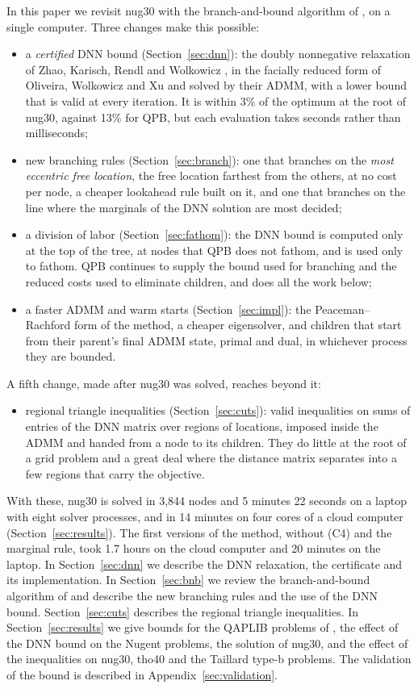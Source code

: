 \documentclass[10pt]{article}
\theoremstyle{remark}
\begin{document}
In this paper we revisit nug30 with the branch-and-bound algorithm of
\cite{ba01,abgl}, on a single computer. Three changes make this possible:
\begin{itemize}
\item[(C1)] a \emph{certified} DNN bound (Section~\ref{sec:dnn}): the doubly
  nonnegative relaxation of Zhao, Karisch, Rendl and Wolkowicz \cite{zkrw}, in the
  facially reduced form of Oliveira, Wolkowicz and Xu \cite{owx} and solved by their
  ADMM, with a lower bound that is valid at every iteration. It is within 3\% of the
  optimum at the root of nug30, against 13\% for QPB, but each evaluation takes
  seconds rather than milliseconds;
\item[(C2)] new branching rules (Section~\ref{sec:branch}): one that branches on the
  \emph{most eccentric free location}, the free location farthest from the others,
  at no cost per node, a cheaper lookahead rule built on it, and one that branches
  on the line where the marginals of the DNN solution are most decided;
\item[(C3)] a division of labor (Section~\ref{sec:fathom}): the DNN bound is computed
  only at the top of the tree, at nodes that QPB does not fathom, and is used only to
  fathom. QPB continues to supply the bound used for branching and the reduced costs
  used to eliminate children, and does all the work below;
\item[(C4)] a faster ADMM and warm starts (Section~\ref{sec:impl}): the
  Peaceman--Rachford form of the method, a cheaper eigensolver, and children that
  start from their parent's final ADMM state, primal and dual, in whichever
  process they are bounded.
\end{itemize}
A fifth change, made after nug30 was solved, reaches beyond it:
\begin{itemize}
\item[(C5)] regional triangle inequalities (Section~\ref{sec:cuts}): valid
  inequalities on sums of entries of the DNN matrix over regions of locations,
  imposed inside the ADMM and handed from a node to its children. They do little
  at the root of a grid problem and a great deal where the distance matrix
  separates into a few regions that carry the objective.
\end{itemize}
With these, nug30 is solved in 3,844 nodes and 5 minutes 22 seconds on a laptop with
eight solver processes, and in 14 minutes on four cores of a cloud computer
(Section~\ref{sec:results}). The first versions of the method, without (C4) and the
marginal rule, took 1.7 hours on the cloud computer and 20 minutes on the laptop. In Section~\ref{sec:dnn}
we describe the DNN relaxation, the certificate and its implementation. In
Section~\ref{sec:bnb} we review the branch-and-bound algorithm of \cite{abgl} and
describe the new branching rules and the use of the DNN bound.
Section~\ref{sec:cuts} describes the regional triangle inequalities. In
Section~\ref{sec:results} we give bounds for the QAPLIB problems of \cite{ab01},
the effect of the DNN bound on the Nugent problems, the solution of nug30, and the
effect of the inequalities on nug30, tho40 and the Taillard type-b problems. The
validation of the bound is described in Appendix~\ref{sec:validation}.
\end{document}
